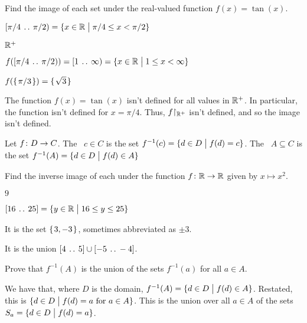 \documentclass{ibl}
\begin{document}
\begin{ex}
Find the image of each set under the real-valued function $f(x)=\tan(x)$.
\begin{exes}
\item $[\pi/4\:\mathinner{\ldotp\ldotp}\:\pi/2)=\{x\in\mathbb{R} \bigm| \pi/4\leq x<\pi/2\}$
\item {}
\item $\mathbb{R}^+$  
\end{exes}
\begin{ans}
\begin{exes}
\item $f([\pi/4\:\mathinner{\ldotp\ldotp}\:\pi/2))=[1\:\mathinner{\ldotp\ldotp}\:\infty)
             =\{x\in\mathbb{R} \bigm| 1\leq x<\infty\}$ 
\item $f(\mbox{$\{\hspace{0.1em}\pi/3\hspace{0.1em}\}$})=\mbox{$\{\hspace{0.1em}\sqrt{3}\hspace{0.1em}\}$}$
\item The function $f(x)=\tan(x)$ isn't defined for all values in $\mathbb{R}^+$.
  In particular, the function isn't defined for $x=\pi/4$.
  Thus, ${f}\mathord\upharpoonright_{\mathbb{R}^+}$ isn't defined, and so the
  image isn't defined.
\end{exes}
\end{ans}
\end{ex}

\begin{df}
Let $\mbox{$f\colon D\to C$}$.
The ~$c\in C$ is
the set $f^{-1}(c)=\{d\in D \bigm| f(d)=c\}$.
The ~$A\subseteq C$
is the set $f^{-1}(A)=\{d\in D \bigm| f(d)\in A\}$   
\end{df}

\begin{ex}
Find the inverse image of each under the function $\mbox{$f\colon \mathbb{R}\to \mathbb{R}$}$ 
given by $x\mapsto x^2$.
\begin{exes}
\item $9$
\item $[16\:\mathinner{\ldotp\ldotp}\:25]=\{y\in\mathbb{R} \bigm| 16\leq y\leq 25\}$
\end{exes}
\begin{ans}
\begin{exes}
\item It is the set $\mbox{$\{\hspace{0.1em}3,-3\hspace{0.1em}\}$}$, sometimes abbreviated as $\pm 3$.
\item It is the union $[4\:\mathinner{\ldotp\ldotp}\:5]\cup [-5\:\mathinner{\ldotp\ldotp}\:-4]$.    
\end{exes}
\end{ans}
\end{ex}

\begin{ex}
Prove that $f^{-1}(A)$ is the union of the sets $f^{-1}(a)$ for all $a\in A$.
\begin{ans}
We have that, where $D$ is the domain, 
$f^{-1}(A)=\{d\in D \bigm| f(d)\in A\}$.
Restated, this is $\{d\in D \bigm| \text{$f(d)=a$ for $a\in A$}\}$.
This is the union over all $a\in A$ of the 
sets $S_a=\{d\in D \bigm| f(d)=a\}$.  
\end{ans}
\end{ex}
\end{document}
